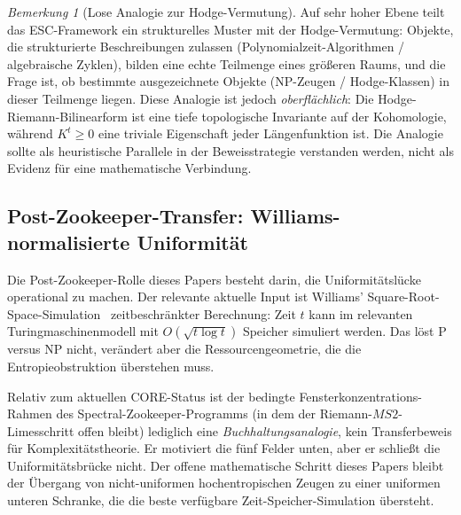 \documentclass[aps,prd,twocolumn,superscriptaddress,nofootinbib]{revtex4-2}
\theoremstyle{definition}
\theoremstyle{remark}
\newtheorem{remark}[theorem]{Bemerkung}
\begin{document}
\begin{remark}[Lose Analogie zur Hodge-Vermutung]
\label{rem:hodge-analogy}
Auf sehr hoher Ebene teilt das ESC-Framework ein strukturelles Muster mit der Hodge-Vermutung: Objekte, die strukturierte Beschreibungen zulassen (Polynomialzeit-Algorithmen / algebraische Zyklen), bilden eine echte Teilmenge eines größeren Raums, und die Frage ist, ob bestimmte ausgezeichnete Objekte (NP-Zeugen / Hodge-Klassen) in dieser Teilmenge liegen. Diese Analogie ist jedoch \emph{oberflächlich}: Die Hodge-Riemann-Bilinearform ist eine tiefe topologische Invariante auf der Kohomologie, während $K^t \geq 0$ eine triviale Eigenschaft jeder Längenfunktion ist. Die Analogie sollte als heuristische Parallele in der Beweisstrategie verstanden werden, nicht als Evidenz für eine mathematische Verbindung.
\end{remark}


\subsection{Post-Zookeeper-Transfer: Williams-normalisierte Uniformität}
\label{subsec:zookeeper-pnp-transfer}

Die Post-Zookeeper-Rolle dieses Papers besteht darin, die Uniformitätslücke operational zu machen. Der relevante aktuelle Input ist Williams' Square-Root-Space-Simulation~\cite{Williams2025} zeitbeschränkter Berechnung: Zeit $t$ kann im relevanten Turingmaschinenmodell mit $O(\sqrt{t\log t})$ Speicher simuliert werden. Das löst P versus NP nicht, verändert aber die Ressourcengeometrie, die die Entropieobstruktion überstehen muss.

Relativ zum aktuellen CORE-Status ist der bedingte Fensterkonzentrations-Rahmen des Spectral-Zookeeper-Programms (in dem der Riemann-$MS2$-Limesschritt offen bleibt) lediglich eine \emph{Buchhaltungsanalogie}, kein Transferbeweis für Komplexitätstheorie. Er motiviert die fünf Felder unten, aber er schließt die Uniformitätsbrücke nicht. Der offene mathematische Schritt dieses Papers bleibt der Übergang von nicht-uniformen hochentropischen Zeugen zu einer uniformen unteren Schranke, die die beste verfügbare Zeit-Speicher-Simulation übersteht.
\end{document}
